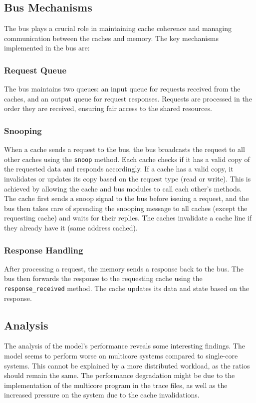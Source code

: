 \subsection{Bus Mechanisms}
The bus plays a crucial role in maintaining cache coherence and managing communication between the caches and memory. The key mechanisms implemented in the bus are:

\subsubsection{Request Queue}
The bus maintains two queues: an input queue for requests received from the caches, and an output queue for request responses. Requests are processed in the order they are received, ensuring fair access to the shared resources.

\subsubsection{Snooping}
When a cache sends a request to the bus, the bus broadcasts the request to all other caches using the \texttt{snoop} method. Each cache checks if it has a valid copy of the requested data and responds accordingly. If a cache has a valid copy, it invalidates or updates its copy based on the request type (read or write). This is achieved by allowing the cache and bus modules to call each other's methods. The cache first sends a snoop signal to the bus before issuing a request, and the bus then takes care of spreading the snooping message to all caches (except the requesting cache) and waits for their replies. The caches invalidate a cache line if they already have it (same address cached).

\subsubsection{Response Handling}
After processing a request, the memory sends a response back to the bus. The bus then forwards the response to the requesting cache using the \texttt{response\_received} method. The cache updates its data and state based on the response.

\subsection{Analysis}
The analysis of the model's performance reveals some interesting findings. The model seems to perform worse on multicore systems compared to single-core systems. This cannot be explained by a more distributed workload, as the ratios should remain the same. The performance degradation might be due to the implementation of the multicore program in the trace files, as well as the increased pressure 
on the system due to the cache invalidations.

